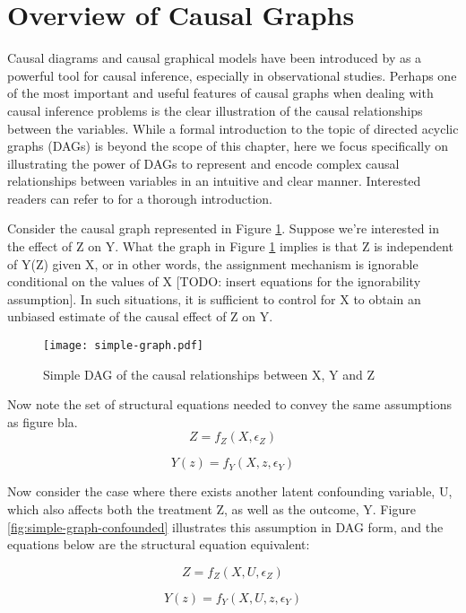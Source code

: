 \section{Overview of Causal Graphs}

Causal diagrams and causal graphical models have been introduced by \citet{pearl_causality_2000} as a powerful tool for causal inference, especially in observational 
studies. Perhaps one of the most important and useful features of causal 
graphs when dealing with causal inference problems is the clear illustration 
of the causal relationships between the variables. 
While a formal introduction to the topic of directed acyclic graphs (DAGs) is beyond the scope of this chapter, 
here we focus specifically on illustrating the power of DAGs to represent 
and encode complex  causal relationships between variables in an intuitive and 
clear manner. Interested readers can refer to \citet{pearl_causality_2000} for a thorough introduction. 


Consider the causal graph represented in Figure \ref{fig:simple-graph}. Suppose we're interested 
in the effect of Z on Y. What the graph in Figure \ref{fig:simple-graph} implies is that Z is 
independent of Y(Z) given X, or in other words, the assignment mechanism is 
ignorable conditional on the values of X [TODO: insert equations for the 
ignorability assumption]. In such situations, it is sufficient to control for 
X to obtain an unbiased estimate of the causal effect of Z on Y. 

\begin{figure}
   \centering
   \texttt{[image: simple-graph.pdf]}
   \caption{Simple DAG of the causal relationships between X, Y and Z}
   \label{fig:simple-graph}
\end{figure}

Now note the set of structural equations needed to convey the same assumptions as figure bla. 
\[Z = f_Z(X, \epsilon_Z)  \]

\[Y(z) = f_Y(X, z, \epsilon_Y)  \]

Now consider the case where there exists another latent confounding variable, U, which also affects both the treatment Z, as well as the outcome, Y. Figure \ref{fig:simple-graph-confounded} illustrates this assumption in DAG form, and the equations below are the structural equation equivalent:

\[Z = f_Z(X, U, \epsilon_Z)  \]

\[Y(z) = f_Y(X, U, z, \epsilon_Y)  \]

